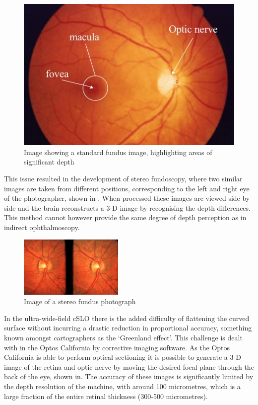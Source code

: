 \begin{figure}[htbp]
\centering
  \includegraphics{figures/normalfundus}
\caption{Image showing a  standard fundus image, highlighting areas of significant depth}
\label{fig:standard}
     \end{figure}

This issue resulted in the development of stereo fundoscopy, where two similar images are taken from different positions, corresponding to the left and right eye of the photographer, shown in . When processed these images are viewed side by side and the brain reconstructs a 3-D image by recognising the depth differences. This method cannot however provide the same degree of depth perception as in indirect ophthalmoscopy.

\begin{figure}[htbp]
\centering
  \includegraphics{figures/stereo}
\caption{Image of a stereo fundus photograph}
\label{fig:stereo}
     \end{figure}

In the ultra-wide-field cSLO there is the added difficulty of flattening the curved surface without incurring a drastic reduction in proportional accuracy, something known amongst cartographers as the ‘Greenland effect’. This challenge is dealt with in the Optos California by corrective imaging software. As the Optos California is able to perform optical sectioning it is possible to generate a 3-D image of the retina and optic nerve by moving the desired focal plane through the back of the eye, shown in. The accuracy of these images is significantly limited by the depth resolution of the machine, with around 100 micrometres, which is a large fraction of the entire retinal thickness (300-500 micrometres). 

